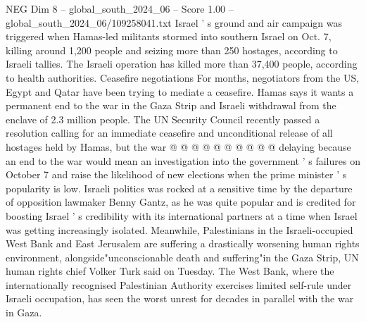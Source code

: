 \begin{textsample}{NEG Dim 8 – global\_south\_2024\_06 – Score 1.00 – global\_south\_2024\_06/109258041.txt}
Israel ' s ground and air campaign was triggered when Hamas-led militants stormed into southern Israel on Oct. 7, killing around 1,200 people and seizing more than 250 hostages, according to Israeli tallies.
The Israeli operation has killed more than 37,400 people, according to health authorities.
Ceasefire negotiations For months, negotiators from the US, Egypt and Qatar have been trying to mediate a ceasefire.
Hamas says it wants a permanent end to the war in the Gaza Strip and Israeli withdrawal from the enclave of 2.3 million people.
The UN Security Council recently passed a resolution calling for an immediate ceasefire and unconditional release of all hostages held by Hamas, but the war @ @ @ @ @ @ @ @ @ @ delaying because an end to the war would mean an investigation into the government ' s failures on October 7 and raise the likelihood of new elections when the prime minister ' s popularity is low.
Israeli politics was rocked at a sensitive time by the departure of opposition lawmaker Benny Gantz, as he was quite popular and is credited for boosting Israel ' s credibility with its international partners at a time when Israel was getting increasingly isolated.
Meanwhile, Palestinians in the Israeli-occupied West Bank and East Jerusalem are suffering a drastically worsening human rights environment, alongside"unconscionable death and suffering"in the Gaza Strip, UN human rights chief Volker Turk said on Tuesday.
The West Bank, where the internationally recognised Palestinian Authority exercises limited self-rule under Israeli occupation, has seen the worst unrest for decades in parallel with the war in Gaza.

\end{textsample}
